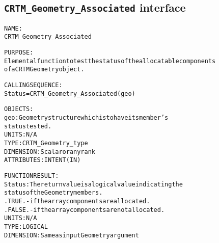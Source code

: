 \subsection{\texttt{CRTM\_Geometry\_Associated} interface}
  \label{sec:CRTM_Geometry_Associated_interface}
  \begin{alltt}
 
  NAME:
        CRTM_Geometry_Associated
 
  PURPOSE:
        Elemental function to test the status of the allocatable components
        of a CRTM Geometry object.
 
  CALLING SEQUENCE:
        Status = CRTM_Geometry_Associated( geo )
 
  OBJECTS:
        geo:          Geometry structure which is to have its member's
                      status tested.
                      UNITS:      N/A
                      TYPE:       CRTM_Geometry_type
                      DIMENSION:  Scalar or any rank
                      ATTRIBUTES: INTENT(IN)
 
  FUNCTION RESULT:
        Status:       The return value is a logical value indicating the
                      status of the Geometry members.
                        .TRUE.  - if the array components are allocated.
                        .FALSE. - if the array components are not allocated.
                      UNITS:      N/A
                      TYPE:       LOGICAL
                      DIMENSION:  Same as input Geometry argument
 
  \end{alltt}
